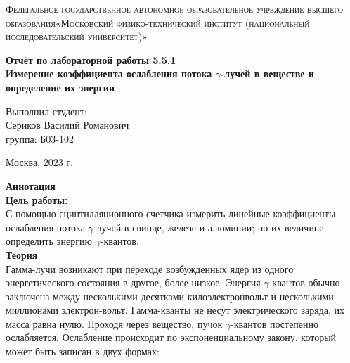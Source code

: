 \documentclass[a4paper, 12pt]{article}%
\begin{document}
	\begin{titlepage}
		\begin{center}
			\textsc{Федеральное государственное автономное образовательное учреждение высшего образования«Московский физико-технический институт (национальный исследовательский университет)»\\[5mm]
			}
			
			\vfill
			
			\textbf{Отчёт по лабораторной работы 5.5.1\\[3mm]
				Измерение коэффициента ослабления потока $ \gamma $-лучей в веществе и определение их энергии
				\\[50mm]
			}
			
		\end{center}
		
		\hfill
		\begin{minipage}{.5\textwidth}
			Выполнил студент:\\[2mm]
			Сериков Василий Романович\\[2mm]
			группа: Б03-102\\[5mm]
			
		\end{minipage}
		\vfill
		\begin{center}
			Москва, 2023 г.
		\end{center}
		
	\end{titlepage}
	
	\newpage
	\setcounter{page}{2}
	\textbf{Аннотация}\\
	
	\textbf{Цель работы: }\\
	
	С помощью сцинтилляционного счетчика измерить линейные коэффициенты ослабления потока $ \gamma $-лучей в свинце, железе и алюминии; по их величине определить энергию $ \gamma $-квантов.\\
	
	\textbf{Теория}\\
	
	Гамма-лучи возникают при переходе возбужденных ядер из одного энергетического состояния в другое, более низкое. Энергия $ \gamma $-квантов обычно заключена между несколькими десятками килоэлектронвольт и несколькими миллионами электрон-вольт. Гамма-кванты не несут электрического заряда, их масса равна нулю. Проходя через вещество, пучок $ \gamma $-квантов постепенно ослабляется. Ослабление происходит по экспоненциальному закону, который может быть записан в двух формах:
	
\end{document}
